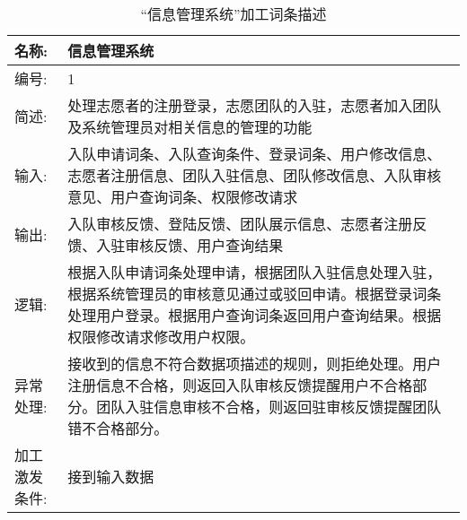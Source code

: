 \begin{table}[H]  
\caption{“信息管理系统”加工词条描述}  
\begin{center}  
    \begin{tabular}{l p{11cm}} 
        \hline
        \quad 名称:  &   信息管理系统 \\
        \hline
        \quad 编号:  & 1 \\
        \hline
        \quad 简述:  & 处理志愿者的注册登录，志愿团队的入驻，志愿者加入团队及系统管理员对相关信息的管理的功能 \\
        \hline
        \quad 输入:  & 入队申请词条、入队查询条件、登录词条、用户修改信息、志愿者注册信息、团队入驻信息、团队修改信息、入队审核意见、用户查询词条、权限修改请求 \\
        \hline
        \quad 输出:  & 入队审核反馈、登陆反馈、团队展示信息、志愿者注册反馈、入驻审核反馈、用户查询结果 \\
        \hline
        \quad 逻辑:  & 根据入队申请词条处理申请，根据团队入驻信息处理入驻，根据系统管理员的审核意见通过或驳回申请。根据登录词条处理用户登录。根据用户查询词条返回用户查询结果。根据权限修改请求修改用户权限。 \\
        \hline
        \quad 异常处理: & 接收到的信息不符合数据项描述的规则，则拒绝处理。用户注册信息不合格，则返回入队审核反馈提醒用户不合格部分。团队入驻信息审核不合格，则返回驻审核反馈提醒团队错不合格部分。\\ 
        \hline
        \quad 加工激发条件: & 接到输入数据 \\ 
        \hline
    \end{tabular}
    \label{tab1}
\end{center}
\end{table}


